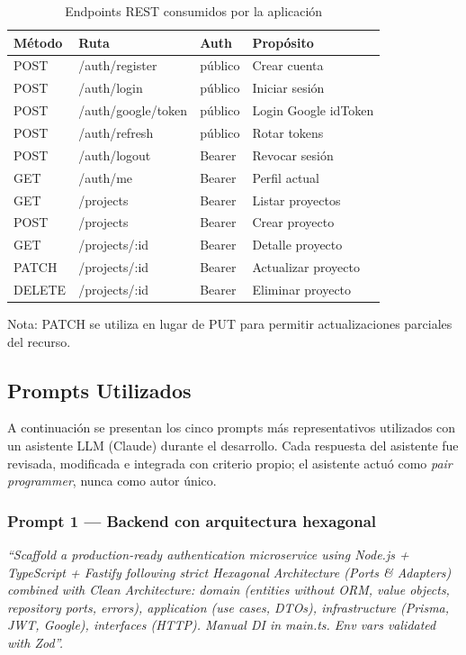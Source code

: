 \documentclass[12pt, a4paper]{article} %
\begin{document}
\begin{table}[h]
    \centering
    \caption{Endpoints REST consumidos por la aplicación}
    \label{tab:endpoints}
    \begin{tabular}{llll}
        \toprule
        \textbf{Método} & \textbf{Ruta} & \textbf{Auth} & \textbf{Propósito} \\
        \midrule
        POST   & /auth/register     & público & Crear cuenta \\
        POST   & /auth/login        & público & Iniciar sesión \\
        POST   & /auth/google/token & público & Login Google idToken \\
        POST   & /auth/refresh      & público & Rotar tokens \\
        POST   & /auth/logout       & Bearer  & Revocar sesión \\
        GET    & /auth/me           & Bearer  & Perfil actual \\
        GET    & /projects          & Bearer  & Listar proyectos \\
        POST   & /projects          & Bearer  & Crear proyecto \\
        GET    & /projects/:id      & Bearer  & Detalle proyecto \\
        PATCH  & /projects/:id      & Bearer  & Actualizar proyecto \\
        DELETE & /projects/:id      & Bearer  & Eliminar proyecto \\
        \bottomrule
    \end{tabular}
    \vspace{0.5em}
    \footnotesize Nota: PATCH se utiliza en lugar de PUT para permitir actualizaciones parciales del recurso.
\end{table}

\subsection{Prompts Utilizados}
\label{sec:prompts}
A continuación se presentan los cinco prompts más representativos
utilizados con un asistente LLM (Claude) durante el desarrollo. Cada
respuesta del asistente fue revisada, modificada e integrada con
criterio propio; el asistente actuó como \textit{pair programmer},
nunca como autor único.

\subsubsection{Prompt 1 — Backend con arquitectura hexagonal}
\textit{``Scaffold a production-ready authentication microservice using
Node.js + TypeScript + Fastify following strict Hexagonal Architecture
(Ports \& Adapters) combined with Clean Architecture: domain (entities
without ORM, value objects, repository ports, errors), application
(use cases, DTOs), infrastructure (Prisma, JWT, Google), interfaces
(HTTP). Manual DI in main.ts. Env vars validated with Zod''.}
\end{document}
